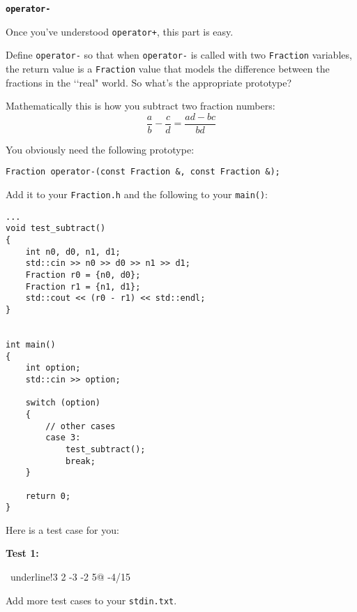 \texttt{\bf operator-}

Once you've understood \verb!operator+!, this part is easy.

Define \verb!operator-! so that when \verb!operator-! is called with two
\verb!Fraction! variables, the return value is a \verb!Fraction! value that
models the difference between the fractions in the \lq\lq real" world. So
what's the appropriate prototype?

Mathematically this is how you subtract two fraction numbers:
\[
\frac{a}{b} -
\frac{c}{d} =
\frac{ad - bc}{bd}
\]

You obviously need the following prototype:

\begin{Verbatim}[frame=single]
Fraction operator-(const Fraction &, const Fraction &);
\end{Verbatim}

Add it to your \verb!Fraction.h! and the following to your \verb!main()!:

{\small
\begin{Verbatim}[frame=single]
...
void test_subtract()
{
    int n0, d0, n1, d1;
    std::cin >> n0 >> d0 >> n1 >> d1;  
    Fraction r0 = {n0, d0};
    Fraction r1 = {n1, d1};
    std::cout << (r0 - r1) << std::endl;
}


int main()
{
    int option;
    std::cin >> option;
    
    switch (option)
    {
        // other cases
        case 3:
            test_subtract();
            break;
    }

    return 0; 
}
\end{Verbatim}
}

Here is a test case for you:

\textbf{Test 1:}
\begin{console}[commandchars=~!@]
~underline!3 2 -3 -2 5@
-4/15
\end{console}

Add more test cases to your \verb!stdin.txt!.

